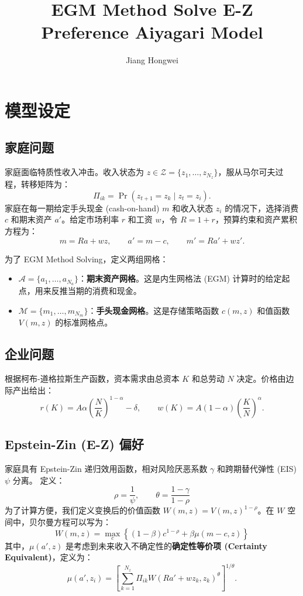 \documentclass[UTF8,a4paper,12pt]{ctexart}
\title{EGM Method Solve E-Z Preference Aiyagari Model}
\author{Jiang Hongwei}
\date{}
\newcommand{\Agrid}{\mathcal{A}}
\newcommand{\Mgrid}{\mathcal{M}}
\newcommand{\Zgrid}{\mathcal{Z}}
\begin{document}
\maketitle

\section{模型设定}

\subsection{家庭问题}

家庭面临特质性收入冲击。收入状态为 $z\in\Zgrid=\{z_1,\ldots,z_{N_z}\}$，服从马尔可夫过程，转移矩阵为：
\[
    \Pi_{ik}=\Pr(z_{t+1}=z_k\mid z_t=z_i).
\]
家庭在每一期给定手头现金 (cash-on-hand) $m$ 和收入状态 $z_i$ 的情况下，选择消费 $c$ 和期末资产 $a'$。给定市场利率 $r$ 和工资 $w$，令 $R=1+r$，预算约束和资产累积方程为：
\[
    m = R a + w z, \qquad a' = m - c, \qquad m' = R a' + w z'.
\]

为了 EGM Method Solving，定义两组网格：
\begin{itemize}
    \item $\Agrid=\{a_1,\ldots,a_{N_a}\}$：\textbf{期末资产网格}。这是内生网格法 (EGM) 计算时的给定起点，用来反推当期的消费和现金。
    \item $\Mgrid=\{m_1,\ldots,m_{N_m}\}$：\textbf{手头现金网格}。这是存储策略函数 $c(m,z)$ 和值函数 $V(m,z)$ 的标准网格点。
\end{itemize}

\subsection{企业问题}

根据柯布-道格拉斯生产函数，资本需求由总资本 $K$ 和总劳动 $N$ 决定。价格由边际产出给出：
\[
    r(K)=A\alpha\left(\frac{N}{K}\right)^{1-\alpha}-\delta,
    \qquad
    w(K)=A(1-\alpha)\left(\frac{K}{N}\right)^\alpha.
\]

\subsection{Epstein-Zin (E-Z) 偏好}

家庭具有 Epstein-Zin 递归效用函数，相对风险厌恶系数 $\gamma$ 和跨期替代弹性 (EIS) $\psi$ 分离。
定义：
\[
    \rho = \frac{1}{\psi},\qquad \theta = \frac{1-\gamma}{1-\rho}
\]
为了计算方便，我们定义变换后的价值函数 $W(m,z) = V(m,z)^{1-\rho}$。在 $W$ 空间中，贝尔曼方程可以写为：
\[
    W(m,z)
    =
    \max_{c} \left\{ (1-\beta)c^{1-\rho} + \beta \mu(m-c, z) \right\}
\]
其中，$\mu(a', z)$ 是考虑到未来收入不确定性的\textbf{确定性等价项 (Certainty Equivalent)}，定义为：
\[
    \mu(a',z_i)
    =
    \left[
        \sum_{k=1}^{N_z}
        \Pi_{ik}
        W(R a'+wz_k,z_k)^\theta
    \right]^{1/\theta}.
\]
\end{document}

